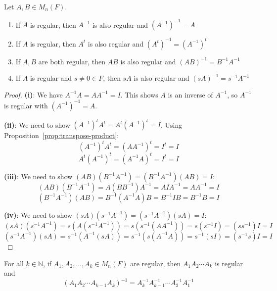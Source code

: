 \begin{theorem}\label{thm:inverse-properties}
    Let $A, B \in M_n(F)$.
    \begin{enumerate}[label=(\roman*)]
        \item If $A$ is regular, then $A^{-1}$ is also regular and $(A^{-1})^{-1} = A$
        \item If $A$ is regular, then $A^t$ is also regular and $(A^t)^{-1} = (A^{-1})^t$
        \item If $A, B$ are both regular, then $AB$ is also regular and $(AB)^{-1} = B^{-1}A^{-1}$
        \item If $A$ is regular and $s \neq 0 \in F$, then $sA$ is also regular and $(sA)^{-1} = s^{-1}A^{-1}$
    \end{enumerate}
\end{theorem}

\begin{proof}
    \textbf{(i)}: We have $A^{-1}A = AA^{-1} = I$. This shows $A$ is an inverse of $A^{-1}$, so $A^{-1}$ is regular with $(A^{-1})^{-1} = A$.
    
    \textbf{(ii)}: We need to show $(A^{-1})^t A^t = A^t(A^{-1})^t = I$. Using Proposition~\ref{prop:transpose-product}:
    \[
    (A^{-1})^t A^t = (AA^{-1})^t = I^t = I
    \]
    \[
    A^t(A^{-1})^t = (A^{-1}A)^t = I^t = I
    \]
    
    \textbf{(iii)}: We need to show $(AB)(B^{-1}A^{-1}) = (B^{-1}A^{-1})(AB) = I$:
    \[
    (AB)(B^{-1}A^{-1}) = A(BB^{-1})A^{-1} = AIA^{-1} = AA^{-1} = I
    \]
    \[
    (B^{-1}A^{-1})(AB) = B^{-1}(A^{-1}A)B = B^{-1}IB = B^{-1}B = I
    \]
    
    \textbf{(iv)}: We need to show $(sA)(s^{-1}A^{-1}) = (s^{-1}A^{-1})(sA) = I$:
    \[
    (sA)(s^{-1}A^{-1}) = s(A(s^{-1}A^{-1})) = s(s^{-1}(AA^{-1})) = s(s^{-1}I) = (ss^{-1})I = I
    \]
    \[
    (s^{-1}A^{-1})(sA) = s^{-1}(A^{-1}(sA)) = s^{-1}(s(A^{-1}A)) = s^{-1}(sI) = (s^{-1}s)I = I
    \]
\end{proof}

\begin{theorem}\label{thm:product-regular}
    For all $k \in \mathbb{N}$, if $A_1, A_2, \ldots, A_k \in M_n(F)$ are regular, then $A_1A_2\cdots A_k$ is regular and
    \[
    (A_1A_2\cdots A_{k-1}A_k)^{-1} = A_k^{-1}A_{k-1}^{-1}\cdots A_2^{-1}A_1^{-1}
    \]
\end{theorem}

